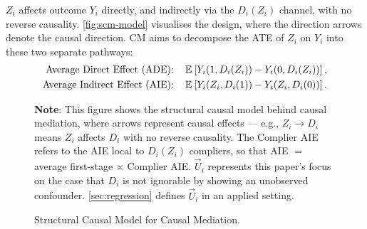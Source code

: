 $Z_i$ affects outcome $Y_i$ directly, and indirectly via the $D_i(Z_i)$ channel, with no reverse causality.
\autoref{fig:scm-model} visualises the design, where the direction arrows denote the causal direction.
CM aims to decompose the ATE of $Z_i$ on $Y_i$ into these two separate pathways:
\begin{align*}
    \text{Average Direct Effect (ADE): } \;\;\;&
        \mathbb{E}_{} \left[ Y_i(1, D_i(Z_i)) - Y_i(0, D_i(Z_i)) \right], \\
    \text{Average Indirect Effect (AIE): } \;\;\;&
            \mathbb{E}_{} \left[ Y_i(Z_i, D_i(1)) - Y_i(Z_i, D_i(0)) \right].
\end{align*}

\begin{figure}[h!]
    \centering
    \singlespacing
    \caption{Structural Causal Model for Causal Mediation.}
    \label{fig:scm-model}
    \justify
    \footnotesize
    \textbf{Note}:
    This figure shows the structural causal model behind causal mediation, where arrows represent causal effects --- e.g., $Z_i \to D_i$ means $Z_i$ affects $D_i$ with no reverse causality.
    The Complier AIE refers to the AIE local to $D_i(Z_i)$ compliers, so that AIE $=$ average first-stage $\times$ Complier AIE.
    $\vec U_i$ represents this paper's focus on the case that $D_i$ is not ignorable by showing an unobserved confounder.
    \autoref{sec:regression} defines $\vec U_i$ in an applied setting.
\end{figure}

